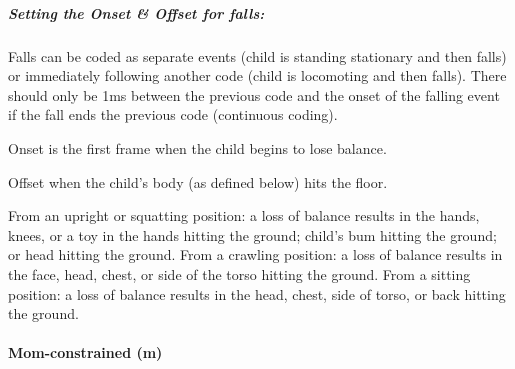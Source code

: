 \documentclass[
  12pt,
]{book}
\begin{document}
\hypertarget{setting-the-onset-offset-for-falls}{%
\subparagraph*{Setting the Onset \& Offset for falls:}\label{setting-the-onset-offset-for-falls}}

Falls can be coded as separate events (child is standing stationary and then falls) or immediately following another code (child is locomoting and then falls). There should only be 1ms between the previous code and the onset of the falling event if the fall ends the previous code (continuous coding).

Onset is the first frame when the child begins to lose balance.

Offset when the child's body (as defined below) hits the floor.

From an upright or squatting position: a loss of balance results in the hands, knees, or a toy in the hands hitting the ground; child's bum hitting the ground; or head hitting the ground.
From a crawling position: a loss of balance results in the face, head, chest, or side of the torso hitting the ground.
From a sitting position: a loss of balance results in the head, chest, side of torso, or back hitting the ground.

\hypertarget{mom_constrained}{%
\paragraph*{Mom-constrained (m)}\label{mom_constrained}}
\end{document}

